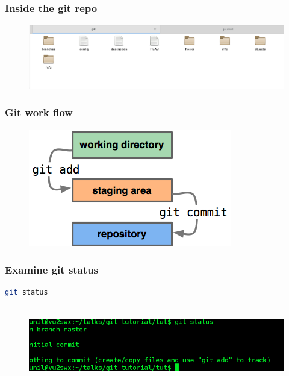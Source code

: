 \documentclass[10pt,a4paper]{beamer}
\begin{document}
\begin{frame}[fragile]
\frametitle{  Inside the git repo}
  \begin{figure}
  \includegraphics[scale=.35]{3}
 \end{figure}

\end{frame}




\begin{frame}[fragile]
\frametitle{ Git work flow}

  \begin{figure}
  \includegraphics[scale=.6]{1}
 \end{figure}


\end{frame}

\begin{frame}[fragile]
\frametitle{  Examine git status}

\begin{lstlisting}[language=bash]
 git status
 
\end{lstlisting}


  \begin{figure}
  \includegraphics[scale=.4]{4}
 \end{figure}


\end{frame}
\end{document}
